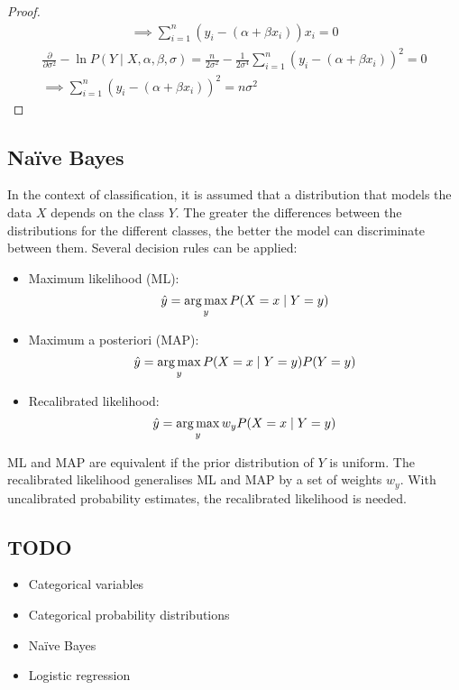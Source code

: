 \begin{thm}
\begin{proof}
\begin{equation}
\begin{split}
        \implies \sum_{i = 1}^{n} (y_i - (\alpha + \beta x_i)) x_i = 0
      \end{split}
    \end{equation}
    \begin{equation}
      \begin{split}
        \frac{\partial}{\partial \sigma^2} - \ln P(Y \mid X, \alpha, \beta, \sigma)
        = \frac{n}{2\sigma^2} - \frac{1}{2\sigma^4} \sum_{i = 1}^{n} (y_i - (\alpha + \beta x_i))^2 = 0 \\
        \implies \sum_{i = 1}^{n} (y_i - (\alpha + \beta x_i))^2 = n\sigma^2
      \end{split}
    \end{equation}
  \end{proof}
\end{thm}

\subsection{Naïve Bayes}

In the context of classification, it is assumed that a distribution that models
the data $X$ depends on the class $Y$.
The greater the differences between the distributions for the different classes,
the better the model can discriminate between them.
Several decision rules can be applied:
\begin{itemize}
  \item Maximum likelihood (ML):
        \begin{equation}
          \hat{y} = \operatorname*{arg\,max}_y P(X = x \mid Y = y)
        \end{equation}
  \item Maximum a posteriori (MAP):
        \begin{equation}
          \hat{y} = \operatorname*{arg\,max}_y P(X = x \mid Y = y) P(Y = y)
        \end{equation}
  \item Recalibrated likelihood:
        \begin{equation}
          \hat{y} = \operatorname*{arg\,max}_y w_y P(X = x \mid Y = y)
        \end{equation}
\end{itemize}
ML and MAP are equivalent if the prior distribution of $Y$ is uniform.
The recalibrated likelihood generalises ML and MAP by a set of weights $w_y$.
With uncalibrated probability estimates, the recalibrated likelihood is needed.

\subsection{TODO}

\begin{itemize}
  \item Categorical variables
  \item Categorical probability distributions
  \item Naïve Bayes
  \item Logistic regression
\end{itemize}